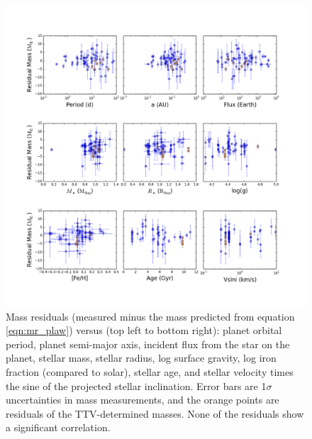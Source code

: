 \documentclass[iop]{emulateapj}
\begin{document}
\begin{figure}[htbp] %
   \centering
    \includegraphics[width=6in]{mr_resids.png} 
   \caption{\small Mass residuals (measured minus the mass predicted from equation \ref{eqn:mr_plaw}) versus (top left to bottom right): planet orbital period, planet semi-major axis, incident flux from the star on the planet, stellar mass, stellar radius, log surface gravity, log iron fraction (compared to solar), stellar age, and stellar velocity times the sine of the projected stellar inclination. Error bars are 1$\sigma$ uncertainties in mass measurements, and the orange points are residuals of the TTV-determined masses.  None of the residuals show a significant correlation.}
   \label{fig:resids}
\end{figure}

\clearpage
\end{document}

